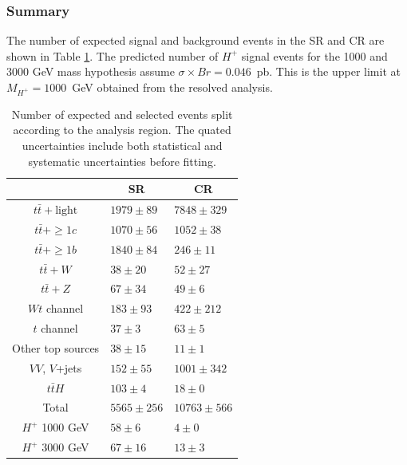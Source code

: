 \subsubsection{Summary}
The number of expected signal and background events in the SR and CR are shown in Table \ref{tab:PrefitYields}. The predicted number of $H^{+}$ signal events for the 1000 and 3000 GeV mass hypothesis assume ${\sigma}{\times}Br=0.046$~pb. This is the upper limit at $M_{H^{+}}=1000$~GeV obtained from the resolved analysis.

\begin{table}[H]
  \centering
  \begin{tabular*}{150mm}{@{\extracolsep{\fill}}cll}
    \hline\hline
                            & \multicolumn{1}{c}{SR} & \multicolumn{1}{c}{CR}\\
    \hline
    $t\bar{t}+\text{light}$ & $1979\pm 89$           & $ 7848\pm329$ \\
    $t\bar{t}+\geq1c$       & $1070\pm 56$           & $ 1052\pm 38$ \\
    $t\bar{t}+\geq1b$       & $1840\pm 84$           & $  246\pm 11$ \\
    $t\bar{t}+W$            & $  38\pm 20$           & $   52\pm 27$ \\
    $t\bar{t}+Z$            & $  67\pm 34$           & $   49\pm  6$ \\
    $Wt$ channel            & $ 183\pm 93$           & $  422\pm212$ \\
    $t$ channel             & $  37\pm  3$           & $   63\pm  5$ \\
    Other top sources       & $  38\pm 15$           & $   11\pm  1$ \\
    $VV$, $V$+jets          & $ 152\pm 55$           & $ 1001\pm342$ \\
    $t\bar{t}H$             & $ 103\pm  4$           & $   18\pm  0$ \\
    \hline
    Total                   & $5565\pm256$           & $10763\pm566$ \\
    \hline
    $H^{+}$ 1000 GeV        & $  58\pm  6$           & $    4\pm  0$ \\
    $H^{+}$ 3000 GeV        & $  67\pm 16$           & $   13\pm  3$ \\
    \hline\hline
  \end{tabular*}
  \caption{Number of expected and selected events split according to the analysis region. The quated uncertainties include both statistical and systematic uncertainties before fitting.}
  \label{tab:PrefitYields}
\end{table}

